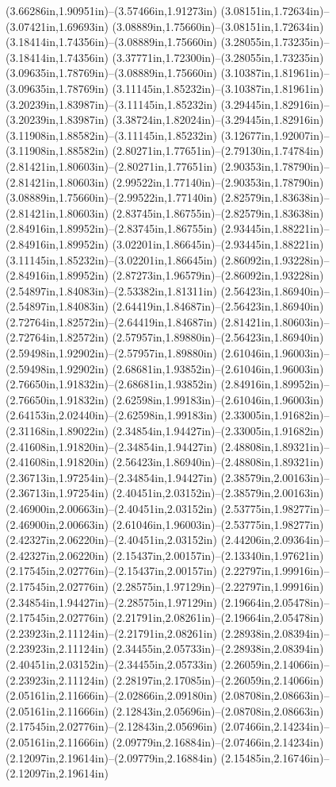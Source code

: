 (3.66286in,1.90951in)--(3.57466in,1.91273in) (3.08151in,1.72634in)--(3.07421in,1.69693in) (3.08889in,1.75660in)--(3.08151in,1.72634in) (3.18414in,1.74356in)--(3.08889in,1.75660in) (3.28055in,1.73235in)--(3.18414in,1.74356in) (3.37771in,1.72300in)--(3.28055in,1.73235in) (3.09635in,1.78769in)--(3.08889in,1.75660in) (3.10387in,1.81961in)--(3.09635in,1.78769in) (3.11145in,1.85232in)--(3.10387in,1.81961in) (3.20239in,1.83987in)--(3.11145in,1.85232in) (3.29445in,1.82916in)--(3.20239in,1.83987in) (3.38724in,1.82024in)--(3.29445in,1.82916in) (3.11908in,1.88582in)--(3.11145in,1.85232in) (3.12677in,1.92007in)--(3.11908in,1.88582in) (2.80271in,1.77651in)--(2.79130in,1.74784in) (2.81421in,1.80603in)--(2.80271in,1.77651in) (2.90353in,1.78790in)--(2.81421in,1.80603in) (2.99522in,1.77140in)--(2.90353in,1.78790in) (3.08889in,1.75660in)--(2.99522in,1.77140in) (2.82579in,1.83638in)--(2.81421in,1.80603in) (2.83745in,1.86755in)--(2.82579in,1.83638in) (2.84916in,1.89952in)--(2.83745in,1.86755in) (2.93445in,1.88221in)--(2.84916in,1.89952in) (3.02201in,1.86645in)--(2.93445in,1.88221in) (3.11145in,1.85232in)--(3.02201in,1.86645in) (2.86092in,1.93228in)--(2.84916in,1.89952in) (2.87273in,1.96579in)--(2.86092in,1.93228in) (2.54897in,1.84083in)--(2.53382in,1.81311in) (2.56423in,1.86940in)--(2.54897in,1.84083in) (2.64419in,1.84687in)--(2.56423in,1.86940in) (2.72764in,1.82572in)--(2.64419in,1.84687in) (2.81421in,1.80603in)--(2.72764in,1.82572in) (2.57957in,1.89880in)--(2.56423in,1.86940in) (2.59498in,1.92902in)--(2.57957in,1.89880in) (2.61046in,1.96003in)--(2.59498in,1.92902in) (2.68681in,1.93852in)--(2.61046in,1.96003in) (2.76650in,1.91832in)--(2.68681in,1.93852in) (2.84916in,1.89952in)--(2.76650in,1.91832in) (2.62598in,1.99183in)--(2.61046in,1.96003in) (2.64153in,2.02440in)--(2.62598in,1.99183in) (2.33005in,1.91682in)--(2.31168in,1.89022in) (2.34854in,1.94427in)--(2.33005in,1.91682in) (2.41608in,1.91820in)--(2.34854in,1.94427in) (2.48808in,1.89321in)--(2.41608in,1.91820in) (2.56423in,1.86940in)--(2.48808in,1.89321in) (2.36713in,1.97254in)--(2.34854in,1.94427in) (2.38579in,2.00163in)--(2.36713in,1.97254in) (2.40451in,2.03152in)--(2.38579in,2.00163in) (2.46900in,2.00663in)--(2.40451in,2.03152in) (2.53775in,1.98277in)--(2.46900in,2.00663in) (2.61046in,1.96003in)--(2.53775in,1.98277in) (2.42327in,2.06220in)--(2.40451in,2.03152in) (2.44206in,2.09364in)--(2.42327in,2.06220in) (2.15437in,2.00157in)--(2.13340in,1.97621in) (2.17545in,2.02776in)--(2.15437in,2.00157in) (2.22797in,1.99916in)--(2.17545in,2.02776in) (2.28575in,1.97129in)--(2.22797in,1.99916in) (2.34854in,1.94427in)--(2.28575in,1.97129in) (2.19664in,2.05478in)--(2.17545in,2.02776in) (2.21791in,2.08261in)--(2.19664in,2.05478in) (2.23923in,2.11124in)--(2.21791in,2.08261in) (2.28938in,2.08394in)--(2.23923in,2.11124in) (2.34455in,2.05733in)--(2.28938in,2.08394in) (2.40451in,2.03152in)--(2.34455in,2.05733in) (2.26059in,2.14066in)--(2.23923in,2.11124in) (2.28197in,2.17085in)--(2.26059in,2.14066in) (2.05161in,2.11666in)--(2.02866in,2.09180in) (2.08708in,2.08663in)--(2.05161in,2.11666in) (2.12843in,2.05696in)--(2.08708in,2.08663in) (2.17545in,2.02776in)--(2.12843in,2.05696in) (2.07466in,2.14234in)--(2.05161in,2.11666in) (2.09779in,2.16884in)--(2.07466in,2.14234in) (2.12097in,2.19614in)--(2.09779in,2.16884in) (2.15485in,2.16746in)--(2.12097in,2.19614in) 